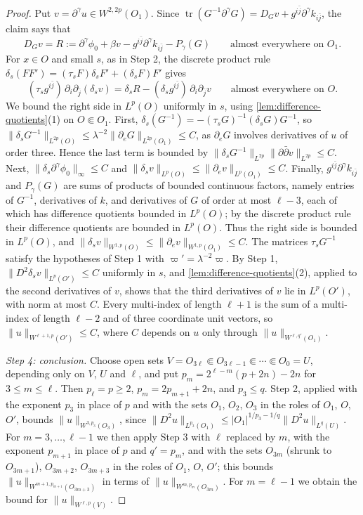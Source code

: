 \begin{proof}
Put $v=\partial^\gamma u\in W^{2,2p}(O_1)$. Since $\operatorname{tr}(G^{-1}\partial^\gamma G)=D_Gv+g^{i\bar j}\partial^\gamma k_{i\bar j}$, the claim says that
\[
 D_Gv=R:=\partial^\gamma\phi_0+\beta v-g^{i\bar j}\partial^\gamma k_{i\bar j}-P_\gamma(G)\qquad\text{almost everywhere on }O_1.
\]
For $x\in O$ and small $s$, as in Step 2, the discrete product rule $\delta_s(FF')=(\tau_sF)\delta_sF'+(\delta_sF)F'$ gives
\[
 (\tau_sg^{i\bar j})\,\partial_i\partial_{\bar j}(\delta_sv)=\delta_sR-(\delta_sg^{i\bar j})\,\partial_i\partial_{\bar j}v\qquad\text{almost everywhere on }O.
\]
We bound the right side in $L^p(O)$ uniformly in $s$, using \cref{lem:difference-quotients}(1) on $O\Subset O_1$. First, $\delta_s(G^{-1})=-(\tau_sG)^{-1}(\delta_sG)G^{-1}$, so $\|\delta_sG^{-1}\|_{L^{2p}(O)}\leq\lambda^{-2}\|\partial_eG\|_{L^{2p}(O_1)}\leq C$, as $\partial_eG$ involves derivatives of $u$ of order three. Hence the last term is bounded by $\|\delta_sG^{-1}\|_{L^{2p}}\|\partial\bar\partial v\|_{L^{2p}}\leq C$. Next, $\|\delta_s\partial^\gamma\phi_0\|_\infty\leq C$ and $\|\delta_sv\|_{L^p(O)}\leq\|\partial_ev\|_{L^p(O_1)}\leq C$. Finally, $g^{i\bar j}\partial^\gamma k_{i\bar j}$ and $P_\gamma(G)$ are sums of products of bounded continuous factors, namely entries of $G^{-1}$, derivatives of $k$, and derivatives of $G$ of order at most $\ell-3$, each of which has difference quotients bounded in $L^p(O)$; by the discrete product rule their difference quotients are bounded in $L^p(O)$. Thus the right side is bounded in $L^p(O)$, and $\|\delta_sv\|_{W^{1,p}(O)}\leq\|\partial_ev\|_{W^{1,p}(O_1)}\leq C$. The matrices $\tau_sG^{-1}$ satisfy the hypotheses of Step 1 with $\varpi'=\lambda^{-2}\varpi$. By Step 1, $\|D^2\delta_sv\|_{L^p(O')}\leq C$ uniformly in $s$, and \cref{lem:difference-quotients}(2), applied to the second derivatives of $v$, shows that the third derivatives of $v$ lie in $L^p(O')$, with norm at most $C$. Every multi-index of length $\ell+1$ is the sum of a multi-index of length $\ell-2$ and of three coordinate unit vectors, so $\|u\|_{W^{\ell+1,p}(O')}\leq C$, where $C$ depends on $u$ only through $\|u\|_{W^{\ell,q'}(O_1)}$.

\emph{Step 4: conclusion.} Choose open sets $V=O_{3\ell}\Subset O_{3\ell-1}\Subset\cdots\Subset O_0=U$, depending only on $V$, $U$ and $\ell$, and put $p_m=2^{\ell-m}(p+2n)-2n$ for $3\leq m\leq\ell$. Then $p_\ell=p\geq2$, $p_m=2p_{m+1}+2n$, and $p_3\leq q$. Step 2, applied with the exponent $p_3$ in place of $p$ and with the sets $O_1$, $O_2$, $O_3$ in the roles of $O_1$, $O$, $O'$, bounds $\|u\|_{W^{3,p_3}(O_3)}$, since $\|D^2u\|_{L^{p_3}(O_1)}\leq|O_1|^{1/p_3-1/q}\|D^2u\|_{L^q(U)}$. For $m=3,\ldots,\ell-1$ we then apply Step 3 with $\ell$ replaced by $m$, with the exponent $p_{m+1}$ in place of $p$ and $q'=p_m$, and with the sets $O_{3m}$ (shrunk to $O_{3m+1}$), $O_{3m+2}$, $O_{3m+3}$ in the roles of $O_1$, $O$, $O'$; this bounds $\|u\|_{W^{m+1,p_{m+1}}(O_{3m+3})}$ in terms of $\|u\|_{W^{m,p_m}(O_{3m})}$. For $m=\ell-1$ we obtain the bound for $\|u\|_{W^{\ell,p}(V)}$.
\end{proof}

